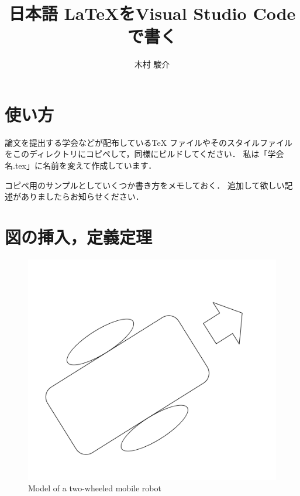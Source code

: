 \documentclass[twocolumn]{jarticle}
\theoremstyle{definition}
\begin{document}
\title{日本語 \LaTeX をVisual Studio Code で書く}
\author{木村 駿介}
\maketitle

\section{使い方}
論文を提出する学会などが配布しているTeX ファイルやそのスタイルファイルをこのディレクトリにコピペして，同様にビルドしてください．
私は「学会名.tex」に名前を変えて作成しています．

コピペ用のサンプルとしていくつか書き方をメモしておく．
追加して欲しい記述がありましたらお知らせください．

\section{図の挿入，定義定理}
\begin{figure}[tb] %
  \begin{center}
      \includegraphics[width=0.8\linewidth]{fig/robot.png}
  \end{center}
  \caption{Model of a two-wheeled mobile robot\label{fig:two_wheeled_mobile_robot}}
\end{figure}
\end{document}
